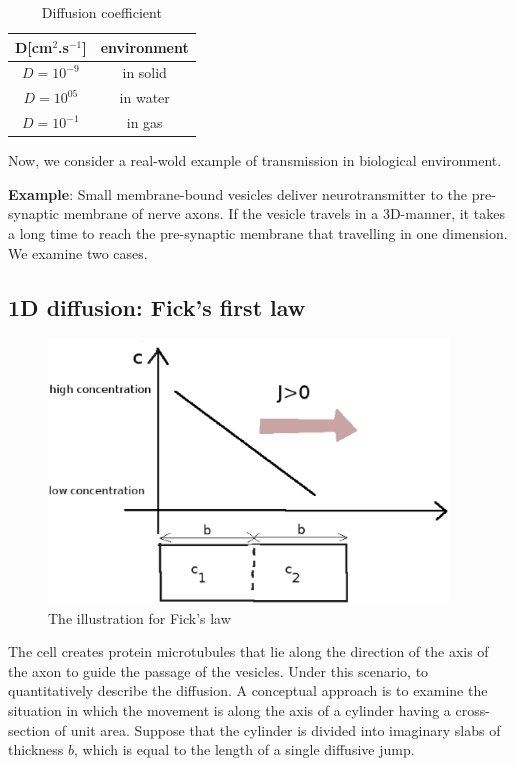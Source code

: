 \begin{table}[hbt]
  \begin{center}
  \begin{tabular}{cc}
\hline
    D[cm$^2$.s$^{-1}$] & environment \\
\hline
$D=10^{-9}$ &  in solid \\
 $D=10^{05}$ & in water \\
$D=10^{-1}$ & in gas \\
\hline
  \end{tabular}
  \end{center}
  \caption{Diffusion coefficient}
  \label{tab:Diffusion}
\end{table}


Now, we consider a real-wold example of transmission in biological
environment.

{\bf Example}: Small membrane-bound vesicles deliver neurotransmitter
to the pre-synaptic membrane of nerve axons.  If the vesicle travels
in a 3D-manner, it takes a long time to reach the pre-synaptic
membrane that travelling in one dimension. We examine two cases.

\subsection{1D diffusion: Fick's first law}
\label{sec:1d-diffusion}

\begin{figure}[hbt]
 \centerline{\includegraphics[height=7cm]{./images/Fick_law.eps}}
\caption{The illustration for Fick's law}
\label{fig:Fick_law}
\end{figure}

The cell creates protein microtubules that lie along the direction of
the axis of the axon to guide the passage of the vesicles. Under this
scenario, to quantitatively describe the diffusion. A conceptual
approach is to examine the situation in which the movement is along
the axis of a cylinder having a cross-section of unit area. Suppose
that the cylinder is divided into imaginary slabs of thickness $b$,
which is equal to the length of a single diffusive jump.

